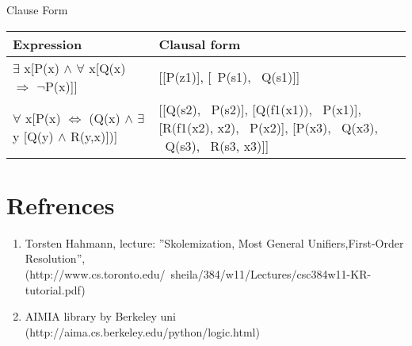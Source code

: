 \begin{center}
Clause Form
\end{center}
\begin{table}[H]
\begin{tabular}{| p{7cm}  | p{7cm} | }
 \hline
Expression  & Clausal form
\\ \hline

$\exists$ x[P(x) $\wedge$ $\forall$ x[Q(x) $\Rightarrow$ $\neg$P(x)]] & [[P(z1)], [~P(s1), ~Q(s1)]] 
\\ \hline
$\forall$ x[P(x) $\Leftrightarrow$ (Q(x) $\wedge$ $\exists$ y [Q(y) $\wedge$ R(y,x)])] & [[Q(s2), ~P(s2)], [Q(f1(x1)), ~P(x1)], [R(f1(x2), x2), ~P(x2)], [P(x3), ~Q(x3), ~Q(s3), ~R(s3, x3)]]

\\ \hline
\end{tabular}
\end{table}

\section{Refrences}
\begin{enumerate}
  \item Torsten Hahmann, lecture: ''Skolemization, Most General
  Uniﬁers,First-Order Resolution'',
  (http://www.cs.toronto.edu/~sheila/384/w11/Lectures/csc384w11-KR-tutorial.pdf)
  \item AIMIA library by Berkeley
  uni (http://aima.cs.berkeley.edu/python/logic.html)
\end{enumerate}

